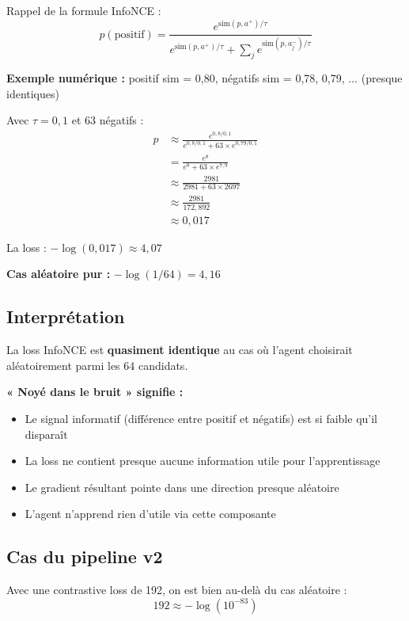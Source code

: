 \documentclass[11pt,a4paper]{article}
\begin{document}
Rappel de la formule InfoNCE :
\begin{equation}
p(\text{positif}) = \frac{e^{\text{sim}(p, a^+)/\tau}}{e^{\text{sim}(p, a^+)/\tau} + \sum_j e^{\text{sim}(p, a^-_j)/\tau}}
\end{equation}

\textbf{Exemple numérique :} positif sim = 0{,}80, négatifs sim = 0{,}78, 0{,}79, $\ldots$ (presque identiques)

Avec $\tau = 0{,}1$ et 63 négatifs :
\begin{align}
p &\approx \frac{e^{0{,}8/0{,}1}}{e^{0{,}8/0{,}1} + 63 \times e^{0{,}79/0{,}1}} \\
&= \frac{e^{8}}{e^{8} + 63 \times e^{7{,}9}} \\
&\approx \frac{2981}{2981 + 63 \times 2697} \\
&\approx \frac{2981}{172{,}892} \\
&\approx 0{,}017
\end{align}

La loss : $-\log(0{,}017) \approx 4{,}07$

\textbf{Cas aléatoire pur :} $-\log(1/64) = 4{,}16$

\subsection{Interprétation}

La loss InfoNCE est \textbf{quasiment identique} au cas où l'agent choisirait aléatoirement parmi les 64 candidats.

\textbf{« Noyé dans le bruit » signifie :}
\begin{itemize}
    \item Le signal informatif (différence entre positif et négatifs) est si faible qu'il disparaît
    \item La loss ne contient presque aucune information utile pour l'apprentissage
    \item Le gradient résultant pointe dans une direction presque aléatoire
    \item L'agent n'apprend rien d'utile via cette composante
\end{itemize}

\subsection{Cas du pipeline v2}

Avec une contrastive loss de 192, on est bien au-delà du cas aléatoire :
\begin{equation}
192 \approx -\log(10^{-83})
\end{equation}
\end{document}
